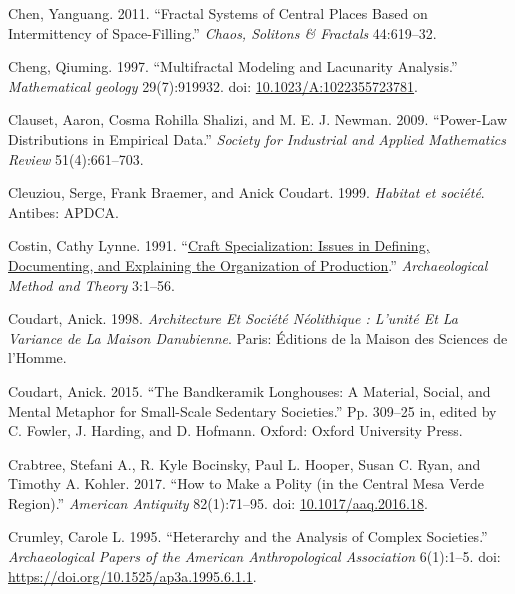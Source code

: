 \documentclass[
  12pt,
]{book}
\newlength{\cslhangindent}
\newlength{\cslentryspacingunit} %
\newenvironment{CSLReferences}[2] %
 {%
  \setlength{\parindent}{0pt}
  \ifodd #1
  \let\oldpar\par
  \def\par{\hangindent=\cslhangindent\oldpar}
  \fi
  \setlength{\parskip}{#2\cslentryspacingunit}
 }%
 {}
\begin{document}
\begin{CSLReferences}{1}{0}
\leavevmode{}%
Chen, Yanguang. 2011. {``Fractal Systems of Central Places Based on Intermittency of Space-Filling.''} \emph{Chaos, Solitons \& Fractals} 44:619--32.

\leavevmode{}%
Cheng, Qiuming. 1997. {``Multifractal Modeling and Lacunarity Analysis.''} \emph{Mathematical geology} 29(7):919932. doi: \href{https://doi.org/10.1023/A:1022355723781}{10.1023/A:1022355723781}.

\leavevmode{}%
Clauset, Aaron, Cosma Rohilla Shalizi, and M. E. J. Newman. 2009. {``Power-Law Distributions in Empirical Data.''} \emph{Society for Industrial and Applied Mathematics Review} 51(4):661--703.

\leavevmode{}%
Cleuziou, Serge, Frank Braemer, and Anick Coudart. 1999. \emph{Habitat et société}. Antibes: APDCA.

\leavevmode{}%
Costin, Cathy Lynne. 1991. {``\href{https://www.jstor.org/stable/20170212}{Craft Specialization: Issues in Defining, Documenting, and Explaining the Organization of Production}.''} \emph{Archaeological Method and Theory} 3:1--56.

\leavevmode{}%
Coudart, Anick. 1998. \emph{Architecture Et Société Néolithique : L'unité Et La Variance de La Maison Danubienne}. Paris: Éditions de la Maison des Sciences de l'Homme.

\leavevmode{}%
Coudart, Anick. 2015. {``The Bandkeramik Longhouses: A Material, Social, and Mental Metaphor for Small-Scale Sedentary Societies.''} Pp. 309--25 in, edited by C. Fowler, J. Harding, and D. Hofmann. Oxford: Oxford University Press.

\leavevmode{}%
Crabtree, Stefani A., R. Kyle Bocinsky, Paul L. Hooper, Susan C. Ryan, and Timothy A. Kohler. 2017. {``How to Make a Polity (in the Central Mesa Verde Region).''} \emph{American Antiquity} 82(1):71--95. doi: \href{https://doi.org/10.1017/aaq.2016.18}{10.1017/aaq.2016.18}.

\leavevmode{}%
Crumley, Carole L. 1995. {``Heterarchy and the Analysis of Complex Societies.''} \emph{Archaeological Papers of the American Anthropological Association} 6(1):1--5. doi: \url{https://doi.org/10.1525/ap3a.1995.6.1.1}.


\end{CSLReferences}
\end{document}
